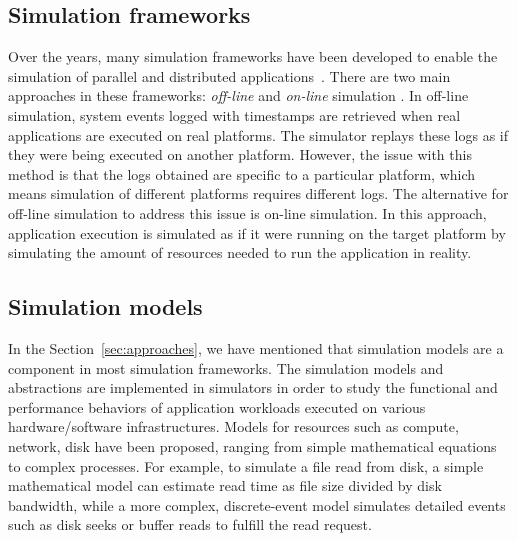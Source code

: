 \subsection{Simulation frameworks}

Over the years, many simulation frameworks have been developed to enable 
the simulation of parallel and distributed 
applications~\cite{optorsim, gridsim, groudsim, cloudsim,
nunez2012simcan,nunez2012icancloud, mdcsim, dissect_cf,
cloudnetsimplusplus, fognetsimplusplus, casanova2014simgrid,
ROSS, casanova2020fgcs}. 
There are two main approaches in these frameworks: \textit{off-line} and 
\textit{on-line} simulation \cite{casanova2014simgrid}. 
In off-line simulation, system events logged with timestamps are retrieved 
when real applications are executed on real platforms.
The simulator replays these logs as if they were being executed 
on another platform. 
However, the issue with this method is that the logs obtained are specific to 
a particular platform, which means simulation of different platforms 
requires different logs.
The alternative for off-line simulation to address this issue is 
on-line simulation.
In this approach, application execution is simulated as if it were running 
on the target platform by simulating the amount of resources needed 
to run the application in reality. 

\subsection{Simulation models}
\label{sec:simmodel}

In the Section~\ref{sec:approaches}, we have mentioned that simulation models are 
a component in most simulation frameworks.
The simulation models and abstractions are implemented in simulators 
in order to study the functional and performance behaviors of application 
workloads executed on various hardware/software infrastructures. 
Models for resources such as compute, network, disk have been proposed, 
ranging from simple mathematical equations  
to complex processes.
For example, to simulate a file read from disk, a simple mathematical model 
can estimate read time as file size divided by disk bandwidth, 
while a more complex, discrete-event model simulates detailed events 
such as disk seeks or buffer reads to fulfill the read request.

